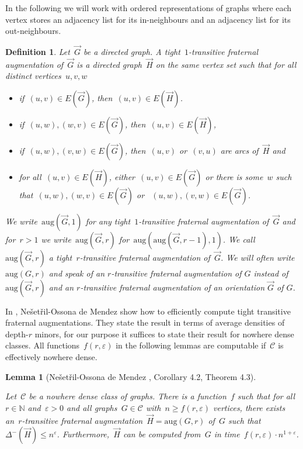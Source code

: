\documentclass[11pt]{article}
\newtheorem{lemma}[theorem]{Lemma}
\newtheorem{definition}[theorem]{Definition}
\numberwithin{equation}{section}
\newcommand{\N}{{\mathbb N}} \newcommand{\Q}{{\mathbb Q}}
\newcommand{\CCC}{\mathcal{C}} \newcommand{\DDD}{\mathcal{D}}
\newcommand{\aug}{\mathrm{aug}}
\renewcommand{\epsilon}{\varepsilon}
\begin{document}
In the following we will work with ordered representations of graphs
where each vertex stores an adjacency list for its in-neighbours and
an adjacency list for its out-neighbours.

\begin{definition}
  Let~$\vec{G}$ be a directed graph. A \emph{tight~$1$-transitive
    fraternal augmentation} of~$\vec{G}$ is a directed graph~$\vec{H}$
  on the same vertex set such that for all distinct vertices~$u,v,w$
  \begin{itemize}
  \item if~$(u,v)\in E(\vec{G})$, then~$(u,v)\in E(\vec{H})$. 
  \item if~$(u,w), (w,v)\in E(\vec{G})$, then~$(u,v)\in E(\vec{H})$,
  \item if~$(u,w), (v,w)\in E(\vec{G})$, then~$(u,v)$ or~$(v,u)$ are
    arcs of~$\vec{H}$ and
  \item for all~$(u,v)\in E(\vec H)$, either~$(u,v)\in E(\vec G)$ or
    there is some~$w$ such that~$(u,w),(w,v)\in E(\vec G)$ or
   ~$(u,w),(v,w)\in E(\vec G)$.
  \end{itemize}
  We write~$\aug(\vec{G},1)$ for any tight~$1$-transitive fraternal
  augmentation of~$\vec{G}$ and for~$r>1$ we write~$\aug(\vec{G}, r)$
  for~$\aug(\aug(\vec{G}, r-1),1)$. We call~$\aug(\vec{G},r)$ a
  tight~$r$-transitive fraternal augmentation of~$\vec{G}$. We will
  often write $\aug(G,r)$ and speak of an $r$-transitive fraternal
  augmentation of $G$ instead of $\aug(\vec{G}, r)$ and an
  $r$-transitive fraternal augmentation of an orientation $\vec{G}$ of
  $G$.
\end{definition}

In \cite{NesetrilO05}, Ne{\v s}et{\v r}il-Ossona de Mendez show how to
efficiently compute tight transitive fraternal augmentations. They
state the result in terms of average densities of depth-$r$ minors,
for our purpose it suffices to state their result for nowhere dense
classes. All functions~$f(r, \epsilon)$ in the following lemmas are
computable if~$\CCC$ is effectively nowhere dense.

\begin{lemma}[Ne{\v s}et{\v r}il-Ossona de Mendez \cite{NesetrilO05},
  Corollary 4.2, Theorem 4.3] \label{thm:computingorientation} 

  Let~$\CCC$ be a nowhere dense class of graphs. There is a
  function~$f$ such that for all~$r\in\N$ and~$\epsilon>0$ and all
  graphs~$G\in\CCC$ with~$n\geq f(r,\epsilon)$ vertices, there exists
  an~$r$-transitive fraternal augmentation~$\vec{H}=\aug(G,r)$ of~$G$
  such that~$\Delta^-(\vec{H})\leq n^\epsilon$. Furthermore,~$\vec{H}$
  can be computed from~$G$ in time~$f(r,\epsilon)\cdot
  n^{1+\epsilon}$.
\end{lemma}
\end{document}
